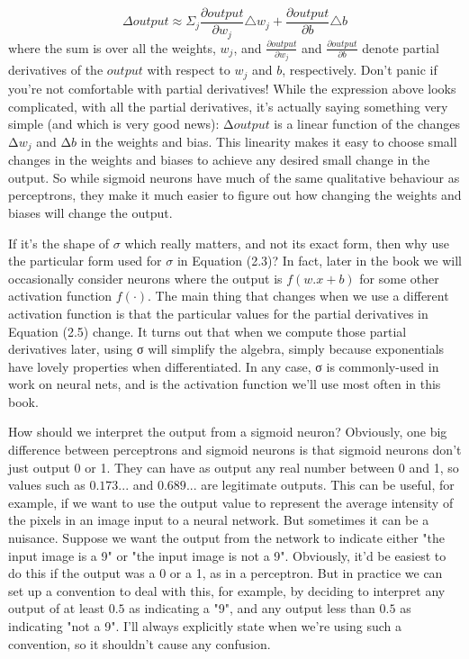 \documentclass[a4paper,12pt]{report}%
\begin{document}
\begin{equation}
\Delta output \approx  \Sigma_{j} \frac{\partial output}{\partial w_{j}} \triangle w_{j} + \frac{ \partial output}{\partial b} \triangle b
\end{equation}
where the sum is over all the weights, $w_{j}$, and $\frac{\partial output}{\partial w_{j}}$ and $\frac{\partial output}{\partial b}$ denote partial derivatives of the $output$ with respect to $w_{j}$ and $b$, respectively. Don't panic if you're not comfortable with partial derivatives! While the expression above looks complicated, with all the partial derivatives, it's actually saying something very simple (and which is very good news): Δ$output$ is a linear function of the changes Δ$w_{j}$ and Δ$b$ in the weights and bias. This linearity makes it easy to choose small changes in the weights and biases to achieve any desired small change in the output. So while sigmoid neurons have much of the same qualitative behaviour as perceptrons, they make it much easier to figure out how changing the weights and biases will change the output.

If it's the shape of $σ$ which really matters, and not its exact form, then why use the particular form used for $\sigma$ in Equation (2.3)? In fact, later in the book we will occasionally consider neurons where the output is $f(w. x+b)$ for some other activation function $f(\cdot)$. The main thing that changes when we use a different activation function is that the particular values for the partial derivatives in Equation (2.5) change. It turns out that when we compute those partial derivatives later, using σ will simplify the algebra, simply because exponentials have lovely properties when differentiated. In any case, σ is commonly-used in work on neural nets, and is the activation function we'll use most often in this book.

How should we interpret the output from a sigmoid neuron? Obviously, one big difference between perceptrons and sigmoid neurons is that sigmoid neurons don't just output 0 or 1. They can have as output any real number between 0 and 1, so values such as $0.173...$ and $0.689...$ are legitimate outputs. This can be useful, for example, if we want to use the output value to represent the average intensity of the pixels in an image input to a neural network. But sometimes it can be a nuisance. Suppose we want the output from the network to indicate either "the input image is a 9" or "the input image is not a 9". Obviously, it'd be easiest to do this if the output was a 0 or a 1, as in a perceptron. But in practice we can set up a convention to deal with this, for example, by deciding to interpret any output of at least $0.5$ as indicating a "9", and any output less than $0.5$ as indicating "not a 9". I'll always explicitly state when we're using such a convention, so it shouldn't cause any confusion.
\end{document}
